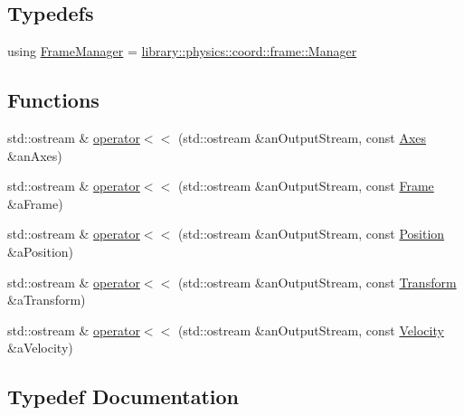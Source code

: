 \subsection*{Typedefs}
\begin{DoxyCompactItemize}
\item 
using \hyperlink{namespacelibrary_1_1physics_1_1coord_a9c01eac7b0a3e3c069800c98650323a8}{Frame\+Manager} = \hyperlink{classlibrary_1_1physics_1_1coord_1_1frame_1_1_manager}{library\+::physics\+::coord\+::frame\+::\+Manager}
\end{DoxyCompactItemize}
\subsection*{Functions}
\begin{DoxyCompactItemize}
\item 
std\+::ostream \& \hyperlink{namespacelibrary_1_1physics_1_1coord_a0fb058763c93734fffc9ea94fa4f7622}{operator$<$$<$} (std\+::ostream \&an\+Output\+Stream, const \hyperlink{classlibrary_1_1physics_1_1coord_1_1_axes}{Axes} \&an\+Axes)
\item 
std\+::ostream \& \hyperlink{namespacelibrary_1_1physics_1_1coord_a87db7cb3ac6183728948d8d018791bb7}{operator$<$$<$} (std\+::ostream \&an\+Output\+Stream, const \hyperlink{classlibrary_1_1physics_1_1coord_1_1_frame}{Frame} \&a\+Frame)
\item 
std\+::ostream \& \hyperlink{namespacelibrary_1_1physics_1_1coord_afd5bbc777e8bf1c1b56405c89bc5ba66}{operator$<$$<$} (std\+::ostream \&an\+Output\+Stream, const \hyperlink{classlibrary_1_1physics_1_1coord_1_1_position}{Position} \&a\+Position)
\item 
std\+::ostream \& \hyperlink{namespacelibrary_1_1physics_1_1coord_ad6bcffb8bfa72e58047397a14d6785a4}{operator$<$$<$} (std\+::ostream \&an\+Output\+Stream, const \hyperlink{classlibrary_1_1physics_1_1coord_1_1_transform}{Transform} \&a\+Transform)
\item 
std\+::ostream \& \hyperlink{namespacelibrary_1_1physics_1_1coord_a5ed104e38499b8be17b32aecbad31c0c}{operator$<$$<$} (std\+::ostream \&an\+Output\+Stream, const \hyperlink{classlibrary_1_1physics_1_1coord_1_1_velocity}{Velocity} \&a\+Velocity)
\end{DoxyCompactItemize}


\subsection{Typedef Documentation}
\mbox{\label{namespacelibrary_1_1physics_1_1coord_a9c01eac7b0a3e3c069800c98650323a8}} 
